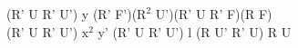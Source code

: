 (R' U R' U') y (R' F')($\text{R}^2$ U')(R' U R' F)(R F)\\
(R' U R' U') $\text{x}^2$ y' (R' U R' U') l (R U' R' U) R U\\
